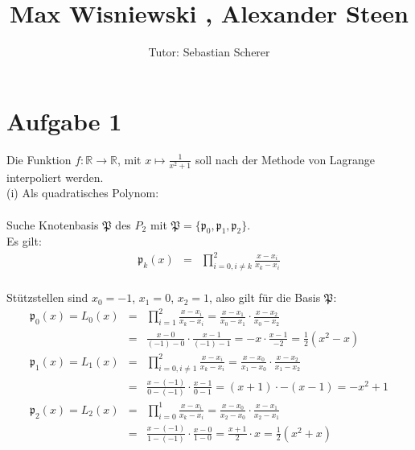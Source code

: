 \documentclass[11pt,a4paper,ngerman]{article}
\author{Tutor: Sebastian Scherer}
\date{}
\title{Max Wisniewski , Alexander Steen}
\begin{document}

\maketitle
\thispagestyle{fancy}



\section*{Aufgabe 1}
Die Funktion $f: \mathbb{R} \to \mathbb{R}$, mit $x \mapsto \frac{1}{x^2+1}$ soll nach der Methode von Lagrange interpoliert werden. \\

(i) Als quadratisches Polynom: \\ \\
Suche Knotenbasis $\mathfrak{P}$ des $P_2$ mit $\mathfrak{P} = \{\mathfrak{p}_0, \mathfrak{p}_1,\mathfrak{p}_2 \}$.\\
Es gilt:
\begin{eqnarray*}
\mathfrak{p}_k(x) & = & \prod_{i = 0, i \neq k}^{2}{\frac{x-x_i}{x_k-x_i}}\\
\end{eqnarray*}

Stützstellen sind $x_0 = -1$, $x_1 = 0$, $x_2 = 1$, also gilt für die Basis $\mathfrak{P}$:
\begin{eqnarray*}
\mathfrak{p}_0(x) = L_0(x) & = & \prod_{i = 1}^{2}{\frac{x-x_i}{x_k-x_i}} = \frac{x-x_1}{x_0-x_1} \cdot \frac{x-x_2}{x_0-x_2} \\
 & = & \frac{x-0}{(-1) - 0} \cdot \frac{x-1}{(-1) - 1} = -x \cdot \frac{x-1}{-2}
   = \frac{1}{2}(x^2 - x)\\
\mathfrak{p}_1(x) = L_1(x) & = & \prod_{i = 0,i \neq 1}^{2}{\frac{x-x_i}{x_k-x_i}} = \frac{x-x_0}{x_1-x_0} \cdot \frac{x-x_2}{x_1-x_2}\\
 & = & \frac{x-(-1)}{0 - (-1)} \cdot \frac{x-1}{0 - 1} = (x+1) \cdot -(x-1) = -x^2 + 1\\
\mathfrak{p}_2(x) = L_2(x)  & = & \prod_{i = 0}^{1}{\frac{x-x_i}{x_k-x_i}} = \frac{x-x_0}{x_2-x_0} \cdot \frac{x-x_1}{x_2-x_1} \\
 & = & \frac{x-(-1)}{1 - (-1)} \cdot \frac{x-0}{1 - 0} = \frac{x+1}{2} \cdot x
   = \frac{1}{2}(x^2 + x)\\
\end{eqnarray*}
\end{document}
